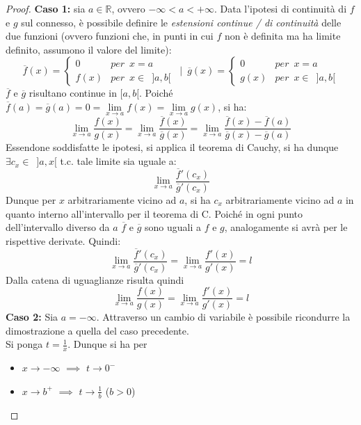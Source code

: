 \documentclass[10pt]{article}
\theoremstyle{plain}
\begin{document}
\begin{proof}
\textbf{Caso 1:} sia $a \in \mathbb{R}$, ovvero $- \infty < a < + \infty$. Data l'ipotesi di continuità di $f$ e $g$ sul connesso, è possibile definire le \textit{estensioni continue / di continuità} delle due funzioni (ovvero funzioni che, in punti in cui $f$ non è definita ma ha limite definito, assumono il valore del limite):
\[\overline{f}(x) = \begin{cases} 0 & per \enspace x = a \\ f(x)  & per \enspace x \in \enspace ]a, b[
\end{cases} \enspace | \enspace \overline{g}(x) = \begin{cases} 0 & per \enspace x = a \\ g(x)  & per \enspace x \in \enspace ]a, b[
\end{cases}\]
$\overline{f}$ e $\overline{g}$ risultano continue in $[a, b[$. Poiché $\overline{f}(a) = \overline{g}(a) = 0 = \lim \limits_{x \rightarrow a} f(x) = \lim \limits_{x \rightarrow a} g(x)$, si ha:
\[\lim \limits_{x \rightarrow a} \frac{f(x)}{g(x)} = \lim \limits_{x \rightarrow a} \frac{\overline{f}(x)}{\overline{g}(x)} = \lim \limits_{x \rightarrow a} \frac{\overline{f}(x) - \overline{f}(a)}{\overline{g}(x) - \overline{g}(a)}\]
Essendone soddisfatte le ipotesi, si applica il teorema di Cauchy, si ha dunque $\exists c_x \in \enspace ]a, x[$ t.c. tale limite sia uguale a:
\[\lim \limits_{x \rightarrow a} \frac{\overline{f}'(c_x)}{\overline{g}'(c_x)}\]
Dunque per $x$ arbitrariamente vicino ad $a$, si ha $c_x$ arbitrariamente vicino ad $a$ in quanto interno all'intervallo per il teorema di C. Poiché in ogni punto dell'intervallo diverso da $a$ $\overline{f}$ e $\overline{g}$ sono uguali a $f$ e $g$, analogamente si avrà per le rispettive derivate. Quindi:
\[\lim \limits_{x \rightarrow a} \frac{\overline{f}'(c_x)}{\overline{g}'(c_x)} = \lim \limits_{x \rightarrow a} \frac{f'(x)}{g'(x)} = l\]
Dalla catena di uguaglianze risulta quindi
\[\lim \limits_{x \rightarrow a} \frac{f(x)}{g(x)} = \lim \limits_{x \rightarrow a} \frac{f'(x)}{g'(x)} = l\]
\textbf{Caso 2:} Sia $a = - \infty$. Attraverso un cambio di variabile è possibile ricondurre la dimostrazione a quella del caso precedente.\\
Si ponga $t = \frac{1}{x}$. Dunque si ha per
\begin{itemize}[label=$\circ$]
    \item $x \rightarrow - \infty$ $\implies$ $t \rightarrow 0^-$
    \item $x \rightarrow b^+$ $\implies$ $t \rightarrow \frac{1}{b}$ ($b > 0$)

\end{itemize}
\end{proof}
\end{document}
